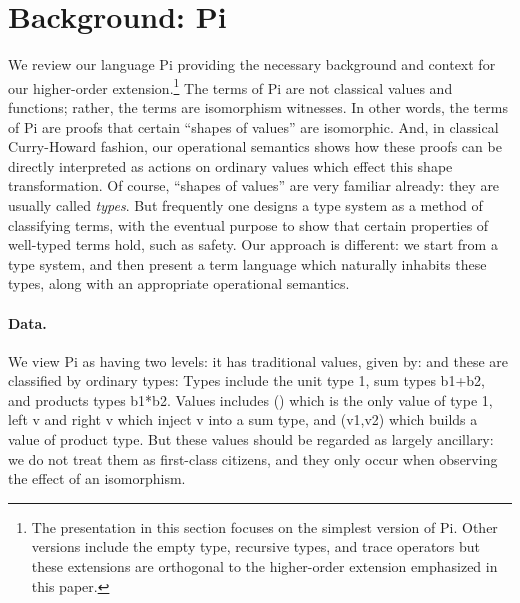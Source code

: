\documentclass{llncs}
\begin{document}
\section{Background: {{Pi}} }
\label{sec:pi}

We review our language {{Pi}} providing the necessary background and
context for our higher-order extension.\footnote{The presentation in this
  section focuses on the simplest version of {{Pi}}. Other versions
  include the empty type, recursive types, and trace operators but these
  extensions are orthogonal to the higher-order extension emphasized in this
  paper.} The terms of {{Pi}} are not classical values and functions;
rather, the terms are isomorphism witnesses.  In other words, the terms of
{{Pi}} are proofs that certain ``shapes of values'' are isomorphic.
And, in classical Curry-Howard fashion, our operational semantics shows how
these proofs can be directly interpreted as actions on ordinary values which
effect this shape transformation. Of course, ``shapes of values'' are very
familiar already: they are usually called \emph{types}.  But frequently one
designs a type system as a method of classifying terms, with the eventual
purpose to show that certain properties of well-typed terms hold, such as
safety.  Our approach is different: we start from a type system, and then
present a term language which naturally inhabits these types, along with an
appropriate operational semantics.

\paragraph*{Data.}
We view {{Pi}} as having two levels:  it has traditional values, given by:
\noindent and these are classified by ordinary types:
\noindent 
Types include the unit type {{1}}, sum types {{b1+b2}}, and
products types {{b1*b2}}.  Values includes {{()}} which is the only value of
type {{1}}, {{left v}} and {{right v}} which inject {{v}} into a sum type,
and {{(v1,v2)}} which builds a value of product type. But these values should
be regarded as largely ancillary: we do not treat them as first-class citizens,
and they only occur when observing the effect of an isomorphism.
\end{document}
